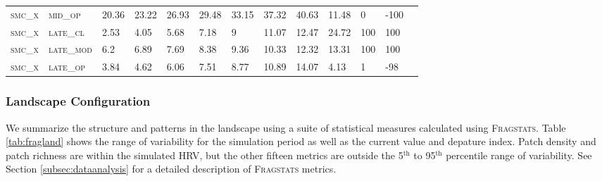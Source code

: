 \begin{landscape}
\begin{table}[!htbp]
\begin{tabular}{@{}lllllllllllll@{}}
\footnotesize \textsc{smc\_x}      & \footnotesize \textsc{mid\_op   }     & \footnotesize 20.36           & \footnotesize 23.22           & \footnotesize 26.93            & \footnotesize 29.48            & \footnotesize 33.15            & \footnotesize 37.32            & \footnotesize 40.63         & \footnotesize 11.48    & \footnotesize 0      & \footnotesize -100     \\
\footnotesize \textsc{smc\_x}      & \footnotesize \textsc{late\_cl  }     & \footnotesize 2.53            & \footnotesize 4.05            & \footnotesize 5.68             & \footnotesize 7.18             & \footnotesize 9                & \footnotesize 11.07            & \footnotesize 12.47         & \footnotesize 24.72    & \footnotesize 100    & \footnotesize 100      \\
\footnotesize \textsc{smc\_x}      & \footnotesize \textsc{late\_mod }     & \footnotesize 6.2             & \footnotesize 6.89            & \footnotesize 7.69             & \footnotesize 8.38             & \footnotesize 9.36             & \footnotesize 10.33            & \footnotesize 12.32         & \footnotesize 13.31    & \footnotesize 100    & \footnotesize 100      \\
\footnotesize \textsc{smc\_x}      & \footnotesize \textsc{late\_op  }     & \footnotesize 3.84            & \footnotesize 4.62            & \footnotesize 6.06             & \footnotesize 7.51             & \footnotesize 8.77             & \footnotesize 10.89            & \footnotesize 14.07         & \footnotesize 4.13     & \footnotesize 1      & \footnotesize -98      \\ \bottomrule 
\end{tabular}
\end{table}
\end{landscape}



\clearpage
\pagebreak[4]
\subsubsection{Landscape Configuration}
We summarize the structure and patterns in the landscape using a suite of statistical measures calculated using \textsc{Fragstats}. Table \ref{tab:fragland} shows the range of variability for the simulation period as well as the current value and depature index. Patch density and patch richness are within the simulated HRV, but the other fifteen metrics are outside the 5$^{\text{th}}$ to 95$^{\text{th}}$ percentile range of variability. See Section \ref{subsec:dataanalysis} for a detailed description of \textsc{Fragstats} metrics.

